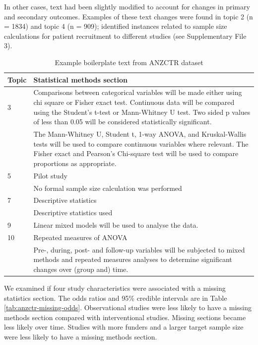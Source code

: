 \documentclass[12pt]{article}
\begin{document}
In other cases, text had been slightly modified to account for changes
in primary and secondary outcomes. Examples of these text changes were
found in topic 2 (n = 1834) and topic 4 (n = 909); identified instances
related to sample size calculations for patient recruitment to different
studies (see Supplementary File 3).

\begin{landscape}
\begin{table}[]
\centering
\caption{Example boilerplate text from ANZCTR dataset}
\label{tab:anzctr-example-boilerplate}
\begin{tabular}{p{0.1\linewidth} p{0.9\linewidth}}
\hline
\textbf{Topic} & \textbf{Statistical methods section} \\ \hline
3 & Comparisons between categorical variables will be made either using chi square or Fisher exact test. Continuous data will be compared using the Student’s t-test or Mann-Whitney U test. Two sided p values of less than 0.05 will be considered statistically significant.\\
 &  The Mann-Whitney U, Student t, 1-way ANOVA, and Kruskal-Wallis tests will be used to compare continuous variables where relevant. The Fisher exact and Pearson’s Chi-square test will be used to compare proportions as appropriate. \\ \hline
5 & Pilot study \\
 &  No formal sample size calculation was performed \\ \hline
7 & Descriptive statistics \\
 &  Descriptive statistics used \\ \hline
9 & Linear mixed models will be used to analyse the data. \\ \hline
10 & Repeated measures of ANOVA \\
 &  Pre-, during, post- and follow-up variables will be subjected to mixed methods and repeated measures analyses to determine significant changes over (group and) time. \\ \hline
\end{tabular}
\end{table}
\end{landscape}

We examined if four study characteristics were associated with a missing
statistics section. The odds ratios and 95\% credible intervals are in
Table \ref{tab:anzctr-missing-odds}. Observational studies were less
likely to have a missing methods section compared with interventional
studies. Missing sections became less likely over time. Studies with
more funders and a larger target sample size were less likely to have a
missing methods section.
\end{document}
